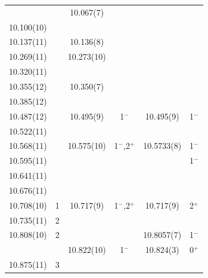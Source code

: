 \begin{center}
\begin{longtable}{cc cc cc}
                  &          &  10.067(7)       &                     &             &                 \\
  10.100(10)      &          &                  &                     &             &                 \\
  10.137(11)      &          &  10.136(8)       &                     &             &                 \\
  10.269(11)      &          &  10.273(10)      &                     &             &                 \\
  10.320(11)      &          &                  &                     &             &                 \\
  10.355(12)      &          &  10.350(7)       &                     &             &                 \\
  10.385(12)      &          &                  &                     &             &                 \\
  10.487(12)      &          &  10.495(9)       & 1$^-$               & 10.495(9)   &  1$^-$          \\
  10.522(11)      &          &                  &                     &             &                 \\
10.568(11)        &          &  10.575(10)      & 1$^-$,2$^+$         & 10.5733(8)  &  1$^-$          \\
  10.595(11)      &          &                  &                     &             &  1$^-$          \\
     10.641(11)   &          &                  &                     &             &                 \\
     10.676(11)   &          &                  &                     &             &                 \\
     10.708(10)   & 1        &  10.717(9)       & 1$^-$,2$^+$         & 10.717(9)   &  2$^+$          \\
     10.735(11)   & 2        &                  &                     &             &                 \\
     10.808(10)   & 2        &                  &                     & 10.8057(7)  &  1$^-$          \\
                  &          &  10.822(10)      &   1$^-$             & 10.824(3)   &  0$^+$          \\
     10.875(11)   & 3        &                  &                     &             &                 \\

\end{longtable}
\end{center}
